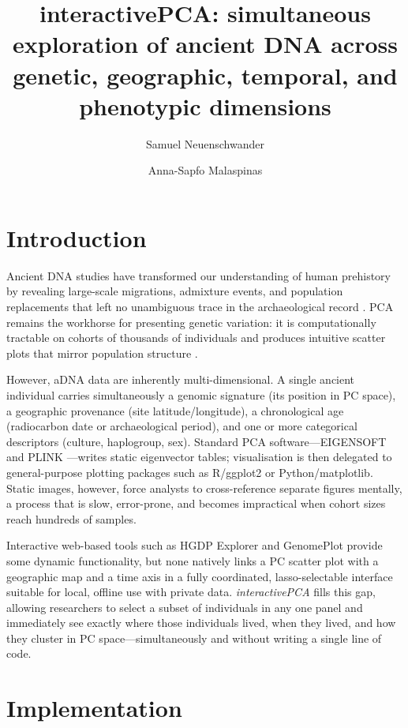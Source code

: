 \documentclass[unnumsec,webpdf,contemporary,large]{oup-authoring-template}
\title[interactivePCA]{interactivePCA: simultaneous exploration of
  ancient DNA across genetic, geographic, temporal, and phenotypic
  dimensions}
\author[1,2,*]{Samuel Neuenschwander}
\author[1,3]{Anna-Sapfo Malaspinas}
\begin{document}
\maketitle

\section{Introduction}

Ancient DNA studies have transformed our understanding of human
prehistory by revealing large-scale migrations, admixture events, and
population replacements that left no unambiguous trace in the
archaeological record
\citep{Haak2015,Mathieson2015,Reich2018}.
PCA remains the workhorse for presenting genetic variation: it is
computationally tractable on cohorts of thousands of individuals and
produces intuitive scatter plots that mirror population structure
\citep{Patterson2006}.

However, aDNA data are inherently multi-dimensional.
A single ancient individual carries simultaneously a genomic signature
(its position in PC space), a geographic provenance (site
latitude/longitude), a chronological age (radiocarbon date or
archaeological period), and one or more categorical descriptors
(culture, haplogroup, sex).
Standard PCA software---EIGENSOFT \citep{Price2006} and PLINK
\citep{Purcell2007}---writes static eigenvector tables; visualisation
is then delegated to general-purpose plotting packages such as
R/ggplot2 or Python/matplotlib.
Static images, however, force analysts to cross-reference separate
figures mentally, a process that is slow, error-prone, and becomes
impractical when cohort sizes reach hundreds of samples.

Interactive web-based tools such as HGDP Explorer and GenomePlot
provide some dynamic functionality, but none natively links a PC
scatter plot with a geographic map and a time axis in a fully
coordinated, lasso-selectable interface suitable for local, offline
use with private data.
\textit{interactivePCA} fills this gap, allowing researchers to select
a subset of individuals in any one panel and immediately see exactly
where those individuals lived, when they lived, and how they cluster in
PC space---simultaneously and without writing a single line of code.

\section{Implementation}
\end{document}
